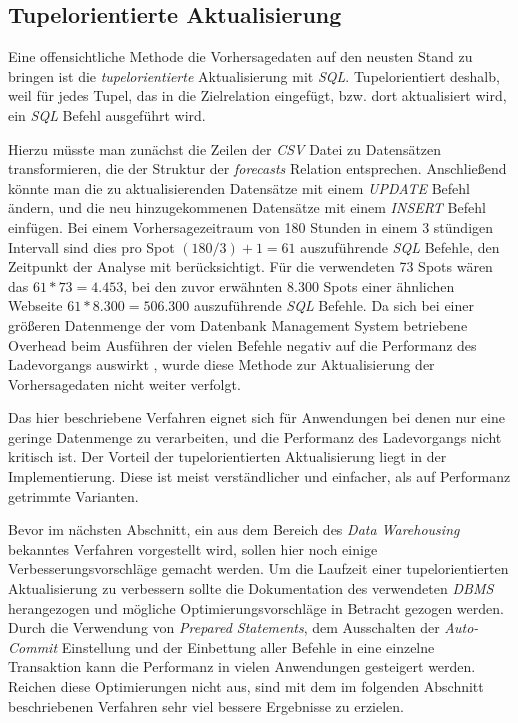 \subsection{Tupelorientierte Aktualisierung}
Eine offensichtliche Methode die Vorhersagedaten auf den neusten Stand
zu bringen ist die \textit{tupelorientierte} Aktualisierung mit
\textit{SQL}. Tupelorientiert deshalb, weil für jedes Tupel, das in
die Zielrelation eingefügt, bzw. dort aktualisiert wird, ein
\textit{SQL} Befehl ausgeführt wird.

Hierzu müsste man zunächst die Zeilen der \textit{CSV} Datei zu
Datensätzen transformieren, die der Struktur der \textit{forecasts}
Relation entsprechen. Anschließend könnte man die zu aktualisierenden
Datensätze mit einem \textit{UPDATE} Befehl ändern, und die neu
hinzugekommenen Datensätze mit einem \textit{INSERT} Befehl
einfügen. Bei einem Vorhersagezeitraum von 180 Stunden in einem 3
stündigen Intervall sind dies pro Spot $(180 / 3) + 1 = 61$
auszuführende \textit{SQL} Befehle, den Zeitpunkt der Analyse mit
berücksichtigt. Für die verwendeten 73 Spots wären das $61 * 73 =
4.453$, bei den zuvor erwähnten 8.300 Spots einer ähnlichen Webseite
$61 * 8.300 = 506.300$ auszuführende \textit{SQL} Befehle. Da sich bei
einer größeren Datenmenge der vom Datenbank Management System
betriebene Overhead beim Ausführen der vielen Befehle negativ auf die
Performanz des Ladevorgangs auswirkt \cite{postgresql:populate}, wurde
diese Methode zur Aktualisierung der Vorhersagedaten nicht weiter
verfolgt.

Das hier beschriebene Verfahren eignet sich für Anwendungen bei denen
nur eine geringe Datenmenge zu verarbeiten, und die Performanz des
Ladevorgangs nicht kritisch ist. Der Vorteil der tupelorientierten
Aktualisierung liegt in der Implementierung. Diese ist meist
verständlicher und einfacher, als auf Performanz getrimmte Varianten.

Bevor im nächsten Abschnitt, ein aus dem Bereich des \textit{Data
  Warehousing} bekanntes Verfahren vorgestellt wird, sollen hier noch
einige Verbesserungsvorschläge gemacht werden. Um die Laufzeit einer
tupelorientierten Aktualisierung zu verbessern sollte die
Dokumentation des verwendeten \textit{DBMS} herangezogen und mögliche
Optimierungsvorschläge in Betracht gezogen werden. Durch die
Verwendung von \textit{Prepared Statements}, dem Ausschalten der
\textit{Auto-Commit} Einstellung und der Einbettung aller Befehle in
eine einzelne Transaktion kann die Performanz in vielen Anwendungen
gesteigert werden. Reichen diese Optimierungen nicht aus, sind mit dem
im folgenden Abschnitt beschriebenen Verfahren sehr viel bessere
Ergebnisse zu erzielen.

